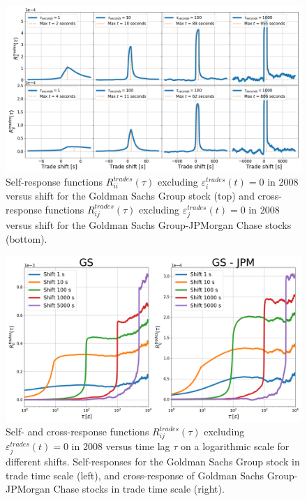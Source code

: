 \begin{figure}[htbp]
    \centering
    \includegraphics[width=\textwidth]{figures/04_shift_trade.png}
    \caption{Self-response functions $R_{ii}^{trades}\left(\tau\right)$
             excluding $\varepsilon^{trades}_{i}\left(t\right) = 0$ in 2008
             versus shift for the Goldman Sachs Group stock (top) and
             cross-response functions $R_{ij}^{trades}\left(\tau\right)$
             excluding $\varepsilon^{trades}_{j}\left(t\right) = 0$ in 2008
             versus shift for the Goldman Sachs Group-JPMorgan Chase stocks
             (bottom).}
    \label{fig:shift_trade_scale}
\end{figure}

\begin{figure}[htbp]
    \centering
    \includegraphics[width=\textwidth]{figures/04_shift_responses_trades.png}
    \caption{Self- and cross-response functions
             $R^{trades}_{ij}\left(\tau\right)$ excluding
             $\varepsilon^{trades}_{j}\left(t\right) = 0$ in 2008 versus time
             lag $\tau$ on a logarithmic scale for different shifts.
             Self-responses for the Goldman Sachs Group stock in trade time
             scale (left), and cross-response of Goldman Sachs Group-JPMorgan
             Chase stocks in trade time scale (right).}
    \label{fig:shift_responses_trade_scale}
\end{figure}

